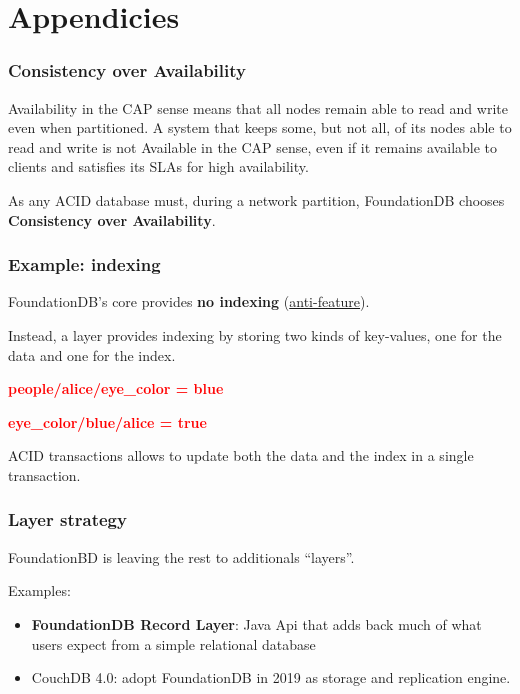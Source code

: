 \section{Appendicies}


\begin{frame}
	\frametitle{Consistency over Availability}

 Availability in the CAP sense means that all nodes remain able to read and write even when partitioned. A system that keeps some, but not all, of its nodes able to read and write is not Available in the CAP sense, even if it remains available to clients and satisfies its SLAs for high availability.
\vspace{0.5cm}

As any ACID database must, during a network partition, FoundationDB chooses \textbf{Consistency over Availability}. 

\end{frame}


\begin{frame}
	\frametitle{Example: indexing}

FoundationDB’s core provides \textbf{no indexing}  (\href{https://apple.github.io/foundationdb/anti-features.html}{anti-feature}).

Instead, a layer provides indexing by storing two kinds of key-values, one for the data and one for the index.

\begin{center}
\textbf{\textcolor{red}{people/alice/eye\_color = blue}}
\end{center}

\begin{center}
\textbf{\textcolor{red}{eye\_color/blue/alice = true}}
\end{center}

ACID transactions allows to update both the data and the index in a single transaction.
\end{frame}


\begin{frame}
	\frametitle{Layer strategy}

FoundationBD is leaving the rest to additionals “layers”.

\vspace{0.5cm}
Examples:
\begin{itemize}
    \item \textbf{FoundationDB Record Layer}: Java Api that adds back much of what users expect from a simple relational database 
    \item CouchDB 4.0: adopt FoundationDB in 2019 as storage and replication engine.
\end{itemize}
\end{frame}

